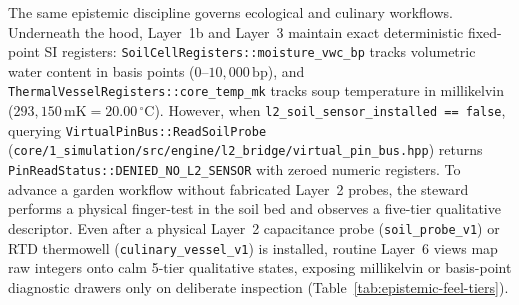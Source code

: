The same epistemic discipline governs ecological and culinary workflows. Underneath the hood, Layer~1b and Layer~3 maintain exact deterministic fixed-point SI registers: \texttt{SoilCellRegisters::moisture\_vwc\_bp} tracks volumetric water content in basis points ($0\text{--}10{,}000\,\text{bp}$), and \texttt{ThermalVesselRegisters::core\_temp\_mk} tracks soup temperature in millikelvin ($293{,}150\,\text{mK} = 20.00\,^\circ\text{C}$). However, when \texttt{l2\_soil\_sensor\_installed == false}, querying \texttt{VirtualPinBus::ReadSoilProbe} (\texttt{core/1\_simulation/src/engine/l2\_bridge/virtual\_pin\_bus.hpp}) returns \texttt{PinReadStatus::DENIED\_NO\_L2\_SENSOR} with zeroed numeric registers. To advance a garden workflow without fabricated Layer~2 probes, the steward performs a physical finger-test in the soil bed and observes a five-tier qualitative descriptor. Even after a physical Layer~2 capacitance probe (\texttt{soil\_probe\_v1}) or RTD thermowell (\texttt{culinary\_vessel\_v1}) is installed, routine Layer~6 views map raw integers onto calm 5-tier qualitative states, exposing millikelvin or basis-point diagnostic drawers only on deliberate inspection (Table~\ref{tab:epistemic-feel-tiers}).

\begin{table}[htbp]
\centering
\caption{Mapping between underlying deterministic SI fixed-point registers, epistemic Layer~2 hardware sensor gates, and calm 1-to-5 qualitative descriptors.}
\label{tab:epistemic-feel-tiers}
\footnotesize
{}
\end{table}

